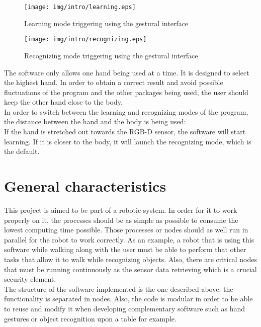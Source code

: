 \begin{figure}
	\centering
    \texttt{[image: img/intro/learning.eps]}
	\caption[Learning Mode Triggering]{Learning mode triggering using the gestural interface}
\end{figure}


\begin{figure}
	\centering
    \texttt{[image: img/intro/recognizing.eps]}
	\caption[Recognizing Mode Triggering]{Recognizing mode triggering using the gestural interface}
\end{figure}

The software only allows one hand being used at a time. It is designed to select the highest hand. In order to obtain a correct result and avoid possible fluctuations of the program and the other packages being used, the user should keep the other hand close to the body. 
\\


In order to switch between the learning and recognizing modes of the program, the distance between the hand and the body
is being used: 
\\

If the hand is stretched out towards the RGB-D sensor, the software will start learning. If it is closer to the body, 
it will launch the recognizing mode, which is the default. 







\section{General characteristics}
This project is aimed to be part of a robotic system. In order for it to work properly on it, the processes should be as simple as possible to consume the lowest computing time possible. Those processes or nodes should as well run in parallel for the robot to work correctly. As an example, a robot that is using this software while walking along with the user must be able to perform that other tasks that allow it to walk while recognizing objects. Also, there are critical nodes that must be running continuously as the sensor data retrieving which is a crucial security element. 
\\

The structure of the software implemented is the one described above: the functionality is separated in nodes. Also, the code is modular in order to be able to reuse and modify it when developing complementary software such as hand gestures or object recognition upon a table for example. 
\\

